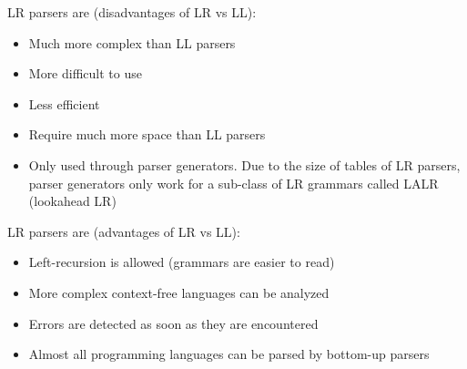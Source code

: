 LR parsers are (disadvantages of LR vs LL):
\begin{itemize}
  \item Much more complex than LL parsers
  \item More difficult to use
  \item Less efficient
  \item Require much more space than LL parsers
  \item Only used through parser generators. Due to 
        the size of tables of LR parsers, parser generators only work for a sub-class of LR grammars called LALR
        (lookahead LR)
\end{itemize}
LR parsers are (advantages of LR vs LL):
\begin{itemize}
  \item Left-recursion is allowed (grammars are easier to read)
  \item More complex context-free languages can be analyzed
  \item Errors are detected as soon as they are encountered
  \item Almost all programming languages can be parsed by bottom-up parsers
\end{itemize}